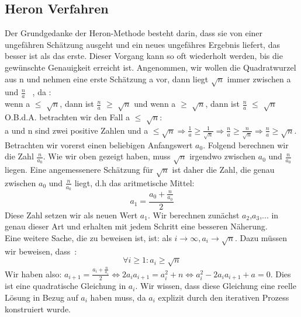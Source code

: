 \documentclass[course=erap]{aspdoc}
\begin{document}
\subsection{Heron Verfahren}

Der Grundgedanke der Heron-Methode besteht darin, dass sie von einer ungefähren Schätzung ausgeht und ein neues ungefähres Ergebnis liefert, das besser ist als das erste. Dieser Vorgang kann so oft wiederholt werden, bis die gewünschte Genauigkeit erreicht ist.
Angenommen, wir wollen die Quadratwurzel aus n und nehmen eine erste Schätzung a vor, dann liegt $\sqrt{n}$ immer zwischen a und $\frac{n}{a}$ ~\cite{HeronLoesungsansatz}, da : \\
wenn a $\leq$ $\sqrt{n}$, dann ist $\frac{n}{a}$ $\geq$  $\sqrt{n}$ und
wenn  a $\geq$ $\sqrt{n}$, dann ist $\frac{n}{a}$ $\leq$  $\sqrt{n}$\\
O.B.d.A. betrachten wir den Fall  a $\leq$ $\sqrt{n}$: \\
a und n sind zwei positive Zahlen und  a $\leq \sqrt{n} \Longrightarrow
    \frac{1}{a} \geq \frac{1}{\sqrt{n}} \Longrightarrow \frac{n}{a} \geq \frac{n}{\sqrt{n}} \Longrightarrow \frac{n}{a} \geq \sqrt{n}$.\\
Betrachten wir vorerst einen beliebigen Anfangswert $a_{0}$. Folgend berechnen wir die Zahl $\frac{n}{a_0}$. Wie wir oben gezeigt haben, muss $\sqrt{n}$ irgendwo zwischen $a_0$ und $\frac{n}{a_0}$ liegen. Eine angemessenere Schätzung für $\sqrt{n}$ ist daher die Zahl, die genau zwischen $a_0$ und $\frac{n}{a_0}$ liegt, d.h das aritmetische Mittel:
\begin{equation}\label{eq10}
    a_1 = \frac{a_0 + \frac{n}{a_0}}{2}
\end{equation}
Diese Zahl setzen wir als neuen Wert $a_1$. Wir berechnen zunächst $a_2$,$a_3$,... in genau dieser Art und erhalten mit jedem Schritt eine besseren Näherung.\\
Eine weitere Sache, die zu beweisen ist, ist: als $i\rightarrow\infty , a_i\rightarrow\sqrt{n} $. Dazu müssen wir beweisen, dass~\cite{Heronsconvergence}:
\begin{equation}\label{eq11}
    \forall i\geq1 : a_i\geq\sqrt{n}
\end{equation}
Wir haben also:
$a_{i+1} = \frac{a_i + \frac{n}{a_i}}{2} \Leftrightarrow
    2a_{i}a_{i+1} = a_i^2 + n \Leftrightarrow
    a_i^2 - 2a_{i}a_{i+1}+a = 0$.
Dies ist eine quadratische Gleichung in $a_i$. Wir wissen, dass diese Gleichung eine reelle Lösung in Bezug auf $a_i$ haben muss, da $a_i$ explizit durch den iterativen Prozess konstruiert wurde.
\end{document}
